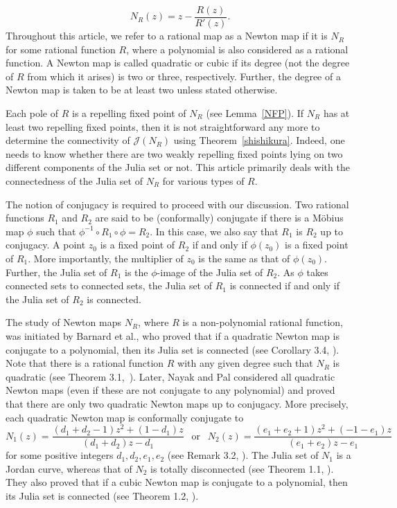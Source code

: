 \documentclass[12pt]{article}
\numberwithin{equation}{section}
\begin{document}
 \begin{equation*}\label{formula_N_R}
 N_R(z)=z-\frac{R(z)}{R'(z)}.
 \end{equation*}
Throughout this article, we refer to a rational map as a Newton map if it is $N_R$ for some rational function $R$, where a polynomial is also considered as a rational function. A Newton map is called quadratic or cubic if its degree (not the degree of $R$ from which it arises) is two or three, respectively. Further, the degree of a Newton map is taken to be at least two unless stated otherwise. 
\par Each pole of $R$ is a repelling fixed point of $N_R$ (see Lemma~\ref{NFP}). If $N_R$ has at least two repelling fixed points, then it is not straightforward any more to determine the connectivity of $\mathcal{J}(N_R)$ using 
 Theorem~\ref{shishikura}. Indeed, one needs to know whether there are two weakly repelling fixed points lying on two different components of the Julia set or not. This article primarily deals with the connectedness of the Julia set of $N_R$ for various types of $R$.
\par 
The notion of conjugacy is required to proceed with our discussion. Two rational functions $R_1$ and $R_2$ are said to be (conformally) conjugate if there is a M\"{o}bius map $\phi$ such that $\phi^{-1} \circ R_1 \circ \phi =R_2$. In this case, we also say that $R_1$ is $R_2$ up to conjugacy. A point $z_0$ is a fixed point of $R_2$ if and only if $\phi(z_0)$ is a fixed point of $R_1$. More importantly, the multiplier of $z_0$ is the same as that of $\phi(z_0)$. Further, the Julia set of $R_1$ is the $\phi$-image of the Julia set of $R_2$. As $\phi$ takes connected sets to connected sets, the Julia set of $R_1$ is connected if and only if the Julia set of $R_2$ is connected.
\par  
The study of Newton maps $N_R$, where $R$ is a non-polynomial rational function, was initiated by Barnard et al., who proved that if a quadratic Newton map is conjugate to a polynomial, then its Julia set is connected (see Corollary 3.4, \cite{Barnard2019}). Note that  there is a rational function $R$ with any given degree  such that $N_R$ is quadratic (see Theorem 3.1,~\cite{Nayak_Pal2022}). Later, Nayak and Pal considered all quadratic Newton maps (even if these are not conjugate to any polynomial) and proved that there are only two quadratic Newton maps up to conjugacy. More precisely, each quadratic Newton map is conformally conjugate to $$N_1 (z)=\frac{(d_1 + d_2 -1)z^2 +(1- d_1)z}{(d_1+d_2)z-d_1}~~ \text{ or }~~ N_2 (z)=\frac{(e_1 + e_2 +1)z^2 +(-1- e_1)z}{(e_1 +e_2)z-e_1}$$ for some positive integers $d_1, d_2, e_1,e_2$ (see Remark 3.2, \cite{Nayak_Pal2022}). The Julia set of $N_1$ is a Jordan curve, whereas that of $N_2$ is totally disconnected (see Theorem 1.1, \cite{Nayak_Pal2022}). They also proved that if a cubic Newton map is conjugate to a polynomial, then its Julia set is connected (see Theorem 1.2, \cite{Nayak_Pal2022}).
\end{document}
